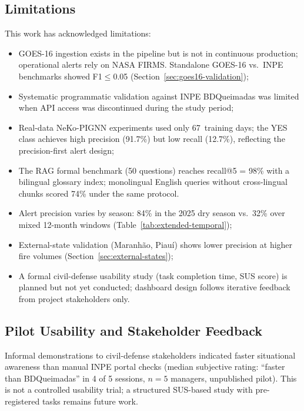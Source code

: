 \documentclass[preprint,12pt,times,numbers]{elsarticle}
\begin{document}
\subsection{Limitations}

This work has acknowledged limitations:

\begin{itemize}
    \item GOES-16 ingestion exists in the pipeline but is not in continuous production; operational alerts rely on NASA FIRMS. Standalone GOES-16 vs.\ INPE benchmarks showed F1$\leq$0.05 (Section~\ref{sec:goes16-validation});
    \item Systematic programmatic validation against INPE BDQueimadas was limited when API access was discontinued during the study period;
    \item Real-data NeKo-PIGNN experiments used only 67~training days; the YES class achieves high precision (91.7\%) but low recall (12.7\%), reflecting the precision-first alert design;
    \item The RAG formal benchmark (50 questions) reaches recall@5 = 98\% with a bilingual glossary index; monolingual English queries without cross-lingual chunks scored 74\% under the same protocol.
    \item Alert precision varies by season: 84\% in the 2025 dry season vs.\ 32\% over mixed 12-month windows (Table~\ref{tab:extended-temporal});
    \item External-state validation (Maranhão, Piauí) shows lower precision at higher fire volumes (Section~\ref{sec:external-states});
    \item A formal civil-defense usability study (task completion time, SUS score) is planned but not yet conducted; dashboard design follows iterative feedback from project stakeholders only.
\end{itemize}

\subsection{Pilot Usability and Stakeholder Feedback}

Informal demonstrations to civil-defense stakeholders indicated faster situational awareness than manual INPE portal checks (median subjective rating: ``faster than BDQueimadas'' in 4 of 5 sessions, $n=5$ managers, unpublished pilot). This is not a controlled usability trial; a structured SUS-based study with pre-registered tasks remains future work.
\end{document}

